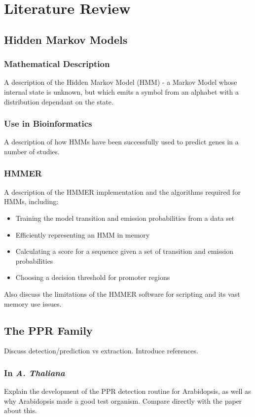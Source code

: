 
\chapter{Literature Review}
\label{chap:theory}

\section{Hidden Markov Models}
\label{sec:HMMs} 

\subsection{Mathematical Description}
\label{ssec:hmm_desc}

A description of the Hidden Markov Model (HMM) - a Markov Model whose internal
state is unknown, but which emits a symbol from an alphabet with a distribution
dependant on the state.

\subsection{Use in Bioinformatics}
\label{ssec:hmms_bioinformatics}

A description of how HMMs have been successfully used to predict genes in a
number of studies.

\subsection{HMMER}
\label{ssec:hmmer}

A description of the HMMER implementation and the algorithms required for HMMs,
including:
\begin{itemize}
  \item Training the model transition and emission probabilities from a data
    set
  \item Efficiently representing an HMM in memory
  \item Calculating a score for a sequence given a set of transition and
    emission probabilities
  \item Choosing a decision threshold for promoter regions
\end{itemize}

Also discuss the limitations of the HMMER software for scripting and its vast
memory use issues.

\section{The PPR Family}
\label{sec:PPR}

Discuss detection/prediction vs extraction. 
Introduce references.

\subsection{In \emph{A. Thaliana}}
\label{ssec:pprs_ara}

Explain the development of the PPR detection routine for Arabidopsis, as well
as why Arabidopsis made a good test organism.
Compare directly with the paper about this.




